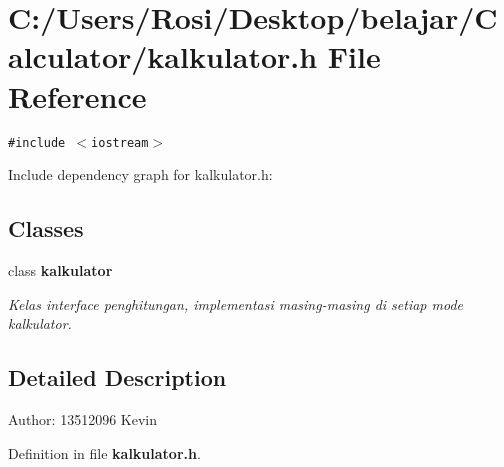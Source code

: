 \section{C:/Users/Rosi/Desktop/belajar/Calculator/kalkulator.h File Reference}
\label{kalkulator_8h}
{\tt \#include $<$iostream$>$}\par


Include dependency graph for kalkulator.h:\subsection*{Classes}
\begin{CompactItemize}
\item 
class {\bf kalkulator}
\begin{CompactList}\small\item\em Kelas interface penghitungan, implementasi masing-masing di setiap mode kalkulator. \item\end{CompactList}\end{CompactItemize}


\subsection{Detailed Description}
\begin{Desc}
\item[Author:]13512096 Kevin \end{Desc}


Definition in file {\bf kalkulator.h}.